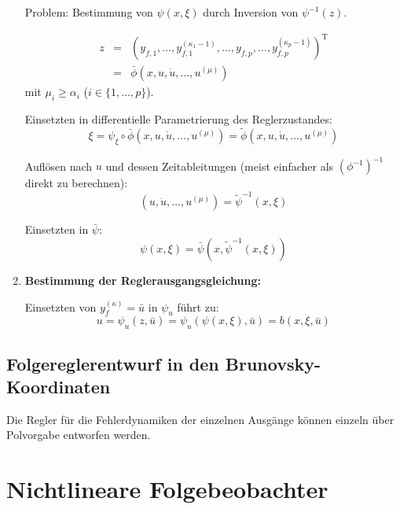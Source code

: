 \begin{enumerate}
        Problem: Bestimmung von $\psi(x, \xi)$ durch Inversion von $\psi^{-1}(z)$.
    
        \begin{eqnarray}
            z &=& {(y_{f,1}, \ldots, y_{f,1}^{(\kappa_1 - 1)}, \ldots, y_{f,p}, \ldots,
                    y_{f,p}^{(\kappa_p - 1)})}^\text{T} \\
              &=& \bar{\phi}(x, u, \dot{u}, \ldots, u^{(\mu)})
        \end{eqnarray}
        mit $\mu_i \geq \alpha_i$ ($i \in \{1, \ldots, p\}$).

        Einsetzten in differentielle Parametrierung des Reglerzustandes:
        \begin{equation}
            \xi = \psi_\xi \circ \bar{\phi}(x, u, \dot{u}, \ldots, u^{(\mu)})
                = \tilde{\phi}(x, u, \dot{u}, \ldots, u^{(\mu)})
        \end{equation}

        Auflösen nach $u$ und dessen Zeitableitungen (meist einfacher als
        ${(\phi^{-1})}^{-1}$ direkt zu berechnen):
        \begin{equation}
            (u, \dot{u}, \ldots, u^{(\mu)}) = \tilde{\psi}^{-1}(x, \xi)
        \end{equation}

        Einsetzten in $\bar{\psi}$:
        \begin{equation}
            \psi(x, \xi) = \bar{\psi}(x, \tilde{\psi}^{-1}(x, \xi))
        \end{equation}
    \item 
        \textbf{Bestimmung der Reglerausgangsgleichung:}

        Einsetzten von $y_f^{(\kappa)} = \bar{u}$ in $\psi_u$ führt zu:
        \begin{equation}
            u = \psi_u(z, \bar{u}) = \psi_u(\psi(x, \xi), \bar{u}) = b(x, \xi, \bar{u}) 
        \end{equation}
\end{enumerate}

\subsection{Folgereglerentwurf in den Brunovsky-Koordinaten}
Die Regler für die Fehlerdynamiken der einzelnen Ausgänge können einzeln über Polvorgabe
entworfen werden.

\section{Nichtlineare Folgebeobachter}
